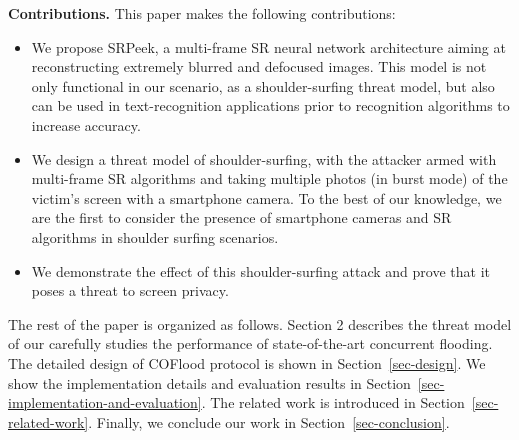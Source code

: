 \vspace{1mm}
\noindent
\textbf{Contributions.} This paper makes the following contributions:
\begin{itemize}[leftmargin=*]
  \item	We propose \textsf{SRPeek}, a multi-frame SR neural network architecture aiming at reconstructing extremely blurred and defocused images. This model is not only functional in our scenario, as a shoulder-surfing threat model, but also can be used in text-recognition applications prior to recognition algorithms to increase accuracy.
  \item	We design a threat model of shoulder-surfing, with the attacker armed with multi-frame SR algorithms and taking multiple photos (in burst mode) of the victim’s screen with a smartphone camera. To the best of our knowledge, we are the first to consider the presence of smartphone cameras and SR algorithms in shoulder surfing scenarios.
  \item	We demonstrate the effect of this shoulder-surfing attack and prove that it poses a threat to screen privacy.
\end{itemize}

The rest of the paper is organized as follows. Section 2 describes the threat model of our  carefully studies the performance of state-of-the-art concurrent flooding. The detailed design of COFlood protocol is shown in Section~\ref{sec-design}. We show the implementation details and evaluation results in Section~\ref{sec-implementation-and-evaluation}. The related work is introduced in Section~\ref{sec-related-work}. Finally, we conclude our work in Section~\ref{sec-conclusion}.
